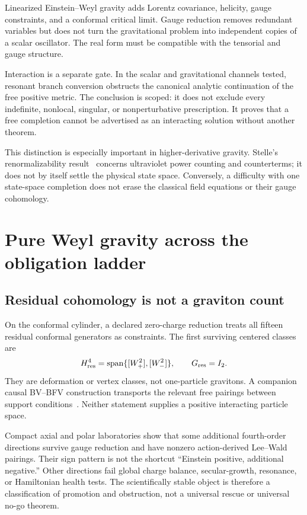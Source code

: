 \documentclass[11pt]{article}
\begin{document}
Linearized Einstein--Weyl gravity adds Lorentz covariance, helicity, gauge
constraints, and a conformal critical limit.  Gauge reduction removes
redundant variables but does not turn the gravitational problem into
independent copies of a scalar oscillator.  The real form must be compatible
with the tensorial and gauge structure.

Interaction is a separate gate.  In the scalar and gravitational channels
tested, resonant branch conversion obstructs the canonical analytic
continuation of the free positive metric.  The conclusion is scoped: it does
not exclude every indefinite, nonlocal, singular, or nonperturbative
prescription.  It proves that a free completion cannot be advertised as an
interacting solution without another theorem.

This distinction is especially important in higher-derivative gravity.
Stelle's renormalizability result~\cite{Stelle} concerns ultraviolet power
counting and counterterms; it does not by itself settle the physical state
space.  Conversely, a difficulty with one state-space completion does not
erase the classical field equations or their gauge cohomology.

\section{Pure Weyl gravity across the obligation ladder}

\subsection{Residual cohomology is not a graviton count}

On the conformal cylinder, a declared zero-charge reduction treats all
fifteen residual conformal generators as constraints.  The first surviving
centered classes are
\[
 H^4_{\rm res}
 =\operatorname{span}\{[W_+^2],[W_-^2]\},
 \qquad G_{\rm res}=I_2.
\]
They are deformation or vertex classes, not one-particle gravitons.  A
companion causal BV--BFV construction transports the relevant free pairings
between support conditions~\cite{BVBFV}.  Neither statement supplies a
positive interacting particle space.

Compact axial and polar laboratories show that some additional fourth-order
directions survive gauge reduction and have nonzero action-derived Lee--Wald
pairings.  Their sign pattern is not the shortcut ``Einstein positive,
additional negative.''  Other directions fail global charge balance,
secular-growth, resonance, or Hamiltonian health tests.  The scientifically
stable object is therefore a classification of promotion and obstruction,
not a universal rescue or universal no-go theorem.
\end{document}

